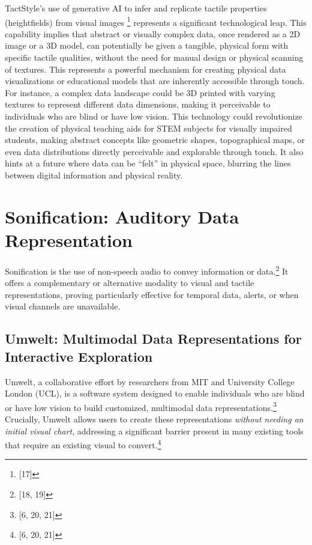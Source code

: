 TactStyle's use of generative AI to infer and replicate tactile properties (heightfields) from visual images \footnote{[17]} represents a significant technological leap. This capability implies that abstract or visually complex data, once rendered as a 2D image or a 3D model, can potentially be given a tangible, physical form with specific tactile qualities, without the need for manual design or physical scanning of textures. This represents a powerful mechanism for creating physical data visualizations or educational models that are inherently accessible through touch. For instance, a complex data landscape could be 3D printed with varying textures to represent different data dimensions, making it perceivable to individuals who are blind or have low vision. This technology could revolutionize the creation of physical teaching aids for STEM subjects for visually impaired students, making abstract concepts like geometric shapes, topographical maps, or even data distributions directly perceivable and explorable through touch. It also hints at a future where data can be ``felt'' in physical space, blurring the lines between digital information and physical reality.

\section{Sonification: Auditory Data Representation}
Sonification is the use of non-speech audio to convey information or data.\footnote{[18, 19]} It offers a complementary or alternative modality to visual and tactile representations, proving particularly effective for temporal data, alerts, or when visual channels are unavailable.

\subsection{Umwelt: Multimodal Data Representations for Interactive Exploration}
Umwelt, a collaborative effort by researchers from MIT and University College London (UCL), is a software system designed to enable individuals who are blind or have low vision to build customized, multimodal data representations.\footnote{[6, 20, 21]} Crucially, Umwelt allows users to create these representations \textit{without needing an initial visual chart}, addressing a significant barrier present in many existing tools that require an existing visual to convert.\footnote{[6, 20, 21]}

